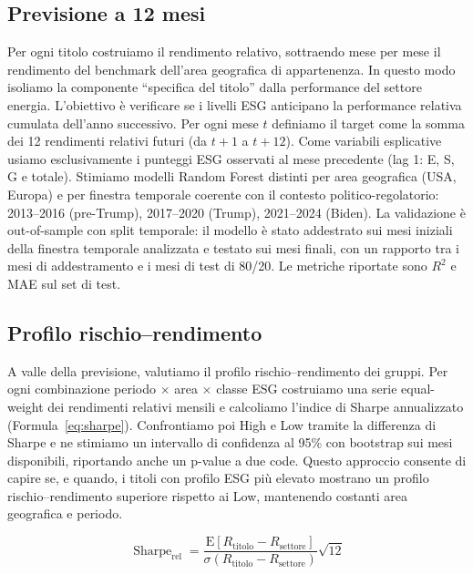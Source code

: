 \documentclass[12pt,a4paper]{article}
\begin{document}
\subsection{Previsione a 12 mesi}

Per ogni titolo costruiamo il rendimento relativo, sottraendo mese per mese il rendimento del benchmark dell'area geografica di appartenenza. In questo modo isoliamo la componente ``specifica del titolo'' dalla performance del settore energia. L'obiettivo è verificare se i livelli ESG anticipano la performance relativa cumulata dell'anno successivo. Per ogni mese $t$ definiamo il target come la somma dei 12 rendimenti relativi futuri (da $t+1$ a $t+12$). Come variabili esplicative usiamo esclusivamente i punteggi ESG osservati al mese precedente (lag 1: E, S, G e totale). Stimiamo modelli Random Forest distinti per area geografica (USA, Europa) e per finestra temporale coerente con il contesto politico-regolatorio: 2013--2016 (pre-Trump), 2017--2020 (Trump), 2021--2024 (Biden). La validazione è out-of-sample con split temporale: il modello è stato addestrato sui mesi iniziali della finestra temporale analizzata e testato sui mesi finali, con un rapporto tra i mesi di addestramento e i mesi di test di 80/20. Le metriche riportate sono $R^2$ e MAE sul set di test.

\subsection{Profilo rischio--rendimento}

A valle della previsione, valutiamo il profilo rischio--rendimento dei gruppi. Per ogni combinazione periodo $\times$ area $\times$ classe ESG costruiamo una serie equal-weight dei rendimenti relativi mensili e calcoliamo l'indice di Sharpe annualizzato (Formula~\ref{eq:sharpe}). Confrontiamo poi High e Low tramite la differenza di Sharpe e ne stimiamo un intervallo di confidenza al 95\% con bootstrap sui mesi disponibili, riportando anche un p-value a due code. Questo approccio consente di capire se, e quando, i titoli con profilo ESG più elevato mostrano un profilo rischio--rendimento superiore rispetto ai Low, mantenendo costanti area geografica e periodo.

\begin{equation}
\operatorname{Sharpe}_{\mathrm{rel}} =
\frac{\mathrm{E}[R_{\mathrm{titolo}}-R_{\mathrm{settore}}]}{\sigma(R_{\mathrm{titolo}}-R_{\mathrm{settore}})}\sqrt{12}
\label{eq:sharpe}
\end{equation}
\end{document}
